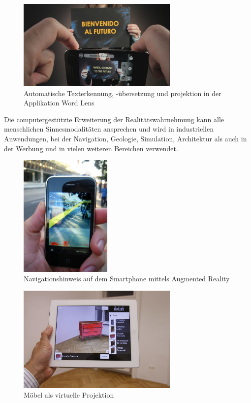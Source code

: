 \documentclass[11pt, a4paper]{article}
\begin{document}
\begin{figure}[h!]
		\centering
		\includegraphics[width=0.7\textwidth]{graphics/augmented-reality/word-lens}
		\caption{Automatische Texterkennung, -\"ubersetzung und projektion in der Applikation Word Lens{\cite{auto-translate-ar}}}
\end{figure}
\noindent Die computergest\"utzte Erweiterung der Realit\"atswahrnehmung kann alle menschlichen Sinnesmodalit\"aten ansprechen und wird in industriellen Anwendungen, bei der Navigation, Geologie, Simulation, Architektur als auch in der Werbung und in vielen weiteren Bereichen verwendet.
\begin{figure}[h!]
		\centering
		\includegraphics[width=0.4\textwidth]{graphics/augmented-reality/navigation}
		\caption{Navigationshinweis auf dem Smartphone mittels Augmented Reality{\cite{navi-ar}}}
\end{figure}
\begin{figure}[h!]
		\centering
		\includegraphics[width=0.7\textwidth]{graphics/augmented-reality/moebel}
		\caption{M\"obel als virtuelle Projektion{\cite{moebel-ar}}}
\end{figure} \\ \\
\end{document}
